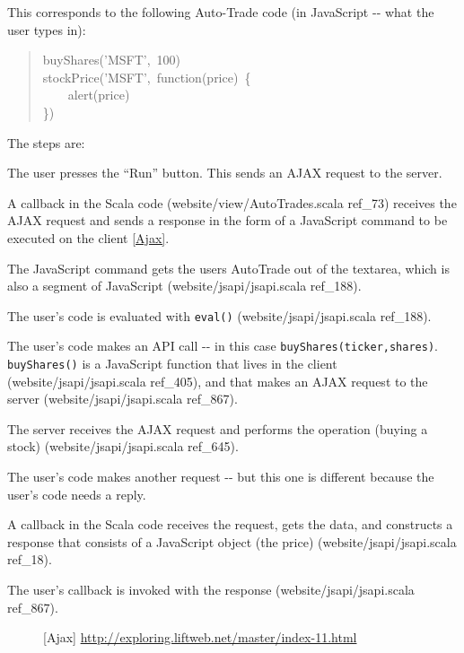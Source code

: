 \documentclass[a4]{article}
\begin{document}
This corresponds to the following Auto-Trade code (in JavaScript -{}- what the
user types in):
%
\begin{quote}{\ttfamily \raggedright \noindent
buyShares('MSFT',~100)\\
stockPrice('MSFT',~function(price)~\{\\
~~~~alert(price)\\
\})
}
\end{quote}

The steps are:
\setcounter{listcnt0}{0}
\begin{list}{.}
{
\setlength{\rightmargin}{\leftmargin}
}

\item The user presses the ``Run'' button. This sends an AJAX request to the server.

\item A callback in the Scala code (website/view/AutoTrades.scala ref\_73) receives the
AJAX request and sends a response in the form of a JavaScript command to be
executed on the client \hyperlink{ajax}{[Ajax]}.

\item The JavaScript command gets the users AutoTrade out of the textarea, which
is also a segment of JavaScript (website/jsapi/jsapi.scala ref\_188).

\item The user's code is evaluated with \texttt{eval()} (website/jsapi/jsapi.scala
ref\_188).

\item The user's code makes an API call -{}- in this case
\texttt{buyShares(ticker,shares)}. \texttt{buyShares()} is a JavaScript function that
lives in the client (website/jsapi/jsapi.scala ref\_405), and that makes an
AJAX request to the server (website/jsapi/jsapi.scala ref\_867).

\item The server receives the AJAX request and performs the operation (buying a
stock) (website/jsapi/jsapi.scala ref\_645).

\item The user's code makes another request -{}- but this one is different because
the user's code needs a reply.

\item A callback in the Scala code receives the request, gets the data, and
constructs a response that consists of a JavaScript object (the price)
(website/jsapi/jsapi.scala ref\_18).

\item The user's callback is invoked with the response (website/jsapi/jsapi.scala
ref\_867).
\end{list}
\begin{figure}[b][Ajax]
\url{http://exploring.liftweb.net/master/index-11.html}
\end{figure}
\end{document}
